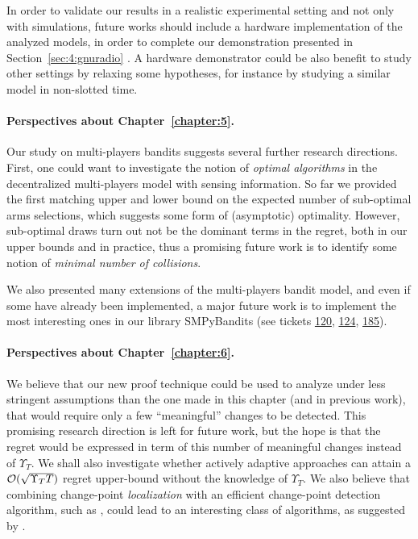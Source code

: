 In order to validate our results in a realistic experimental setting and not only with simulations, future works should include a hardware implementation of the analyzed models, in order to complete our demonstration presented in Section~\ref{sec:4:gnuradio} \cite{Besson2018ICT,Besson2019WCNC}.
%
A hardware demonstrator could be also benefit to study other settings by relaxing some hypotheses, for instance by studying a similar model in non-slotted time.


\paragraph{Perspectives about \textbf{Chapter~\ref{chapter:5}}.}

Our study on multi-players bandits suggests several further research directions.
First, one could want to investigate the notion of \emph{optimal algorithms} in the decentralized multi-players model with sensing information. So far we provided the first matching upper and lower bound on the expected number of sub-optimal arms selections, which suggests some form of (asymptotic) optimality. However, sub-optimal draws turn out not be the dominant terms in the regret, both in our upper bounds and in practice, thus a promising future work is to identify some notion of \emph{minimal number of collisions}.

We also presented many extensions of the multi-players bandit model,
and even if some have already been implemented, a major future work is to implement the most interesting ones in our library SMPyBandits
(see tickets \href{https://github.com/SMPyBandits/SMPyBandits/issues/120}{120}, \href{https://github.com/SMPyBandits/SMPyBandits/issues/124}{124}, \href{https://github.com/SMPyBandits/SMPyBandits/issues/185}{185}).


\paragraph{Perspectives about \textbf{Chapter~\ref{chapter:6}}.}

We believe that our new proof technique could be used to analyze \GLRklUCB{} under less stringent assumptions than the one made in this chapter (and in previous work), that would require only a few ``meaningful'' changes to be detected. This promising research direction is left for future work,  but the hope is that the regret would be expressed in term of this number of meaningful changes instead of $\Upsilon_T$. We shall also investigate whether actively adaptive approaches can attain a $\mathcal{O}(\sqrt{\Upsilon_T T})$ regret upper-bound without the knowledge of $\Upsilon_T$.
We also believe that combining change-point \emph{localization} with an efficient change-point detection algorithm, such as \GLRklUCB, could lead to an interesting class of algorithms, as suggested by \cite{Maillard2018GLR}.

